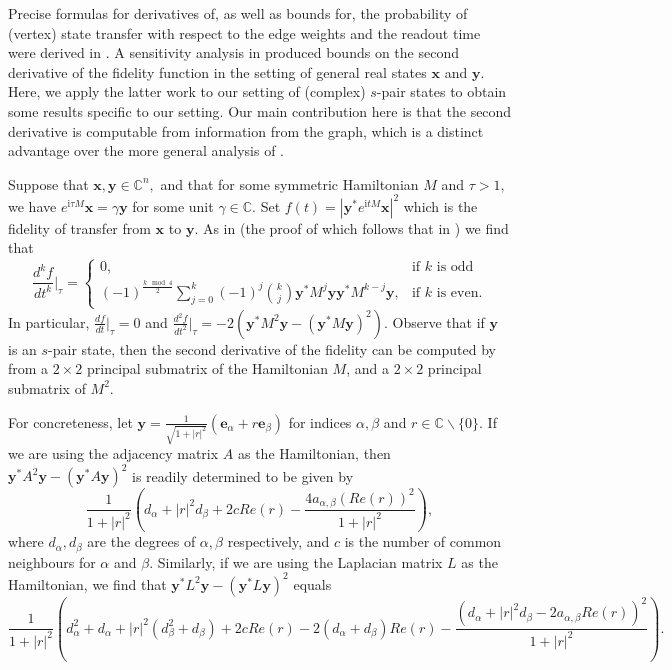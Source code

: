 \documentclass{article}
\numberwithin{equation}{section}
\newcommand{\be}{\mathbf e}
\newcommand{\bx}{\mathbf x}
\newcommand{\by}{\mathbf y}
\def\C{\mathbb{C}}
\def\ii{\mathrm{i}}
\begin{document}
{Precise formulas for derivatives of, as well as bounds for, the probability of (vertex) state transfer with respect to the edge weights and the readout time were derived in \cite{kirkland2015sensitivity,gordon2016bounds}. %
A sensitivity analysis in \cite{godsil2025perfect} produced bounds on the second derivative of the fidelity function in the setting of general real states $\bx$ and $\by$. Here, we apply the latter work to our setting of (complex) $s$-pair states to obtain some results specific to our setting. Our main contribution here is that the second derivative is computable from information from the graph, which is a distinct advantage over the more general analysis of \cite{godsil2025perfect}. 

Suppose that $\bx, \by \in \C^n,$ and that for some symmetric Hamiltonian $M$ and $\tau>1,$ we have $e^{\ii  \tau M}\bx = \gamma \by$ for some unit $\gamma \in \C.$ Set $f(t)=|\by^*e^{\ii  tM}\bx|^2$ which is the fidelity of transfer from $\bx$ to $\by$. As in \cite{godsil2025perfect} (the proof of which  follows that in  \cite{kirkland2015sensitivity}) we find that 
\begin{equation*}
\frac{d^k f}{d t^k}\bigg|_{\tau} = \begin{cases} 
0, & \text{if $k$ is odd} \\
(-1)^{\frac{k \mod 4}{2}}\sum_{j=0}^k(-1)^j {k \choose j } \by^*M^j\by\by^*M^{k-j}\by,  & \text{if $k$ is even.} \end{cases} 
\end{equation*}
In particular, $\frac{d f}{d t}\big|_{\tau} =0$ and $\frac{d^2 f}{d t^2}\big|_{\tau} = -2(\by^*M^2\by - (\by^*M\by)^2).$ Observe that if $\by$ is an $s$-pair state, then the second derivative of the fidelity can be computed by from a $2\times 2$ principal submatrix of the Hamiltonian $M$, and a $2 \times 2$ principal submatrix of $M^2$. 

For concreteness, let $\by=\frac{1}{\sqrt{1+|r|^2}}(\be_\alpha +r\be_\beta)$ for indices $\alpha, \beta$ and $r \in \C\backslash\{0\}$. If we are using the adjacency matrix $A$ as the Hamiltonian, then $\by^*A^2\by - (\by^*A\by)^2$ is readily determined to be given by 
\begin{equation*}
\frac{1}{1+|r|^2}\left(d_\alpha + |r|^2 d_\beta + 2c Re(r)- \frac{4 a_{\alpha, \beta}(Re(r))^2 }{1+|r|^2}\right), 
\end{equation*}
where $d_\alpha, d_\beta$ are the degrees of $\alpha, \beta$ respectively, and $c$ is the number of common neighbours for  $\alpha$ and $ \beta.$ Similarly, if we are using the Laplacian matrix $L$ as the Hamiltonian, we find that $\by^*L^2\by - (\by^*L\by)^2$ equals $$%
\frac{1}{1+|r|^2}\left( d_\alpha^2+d_\alpha +|r|^2(d_\beta^2+d_\beta)+2cRe(r)-2(d_\alpha+d_\beta)Re(r)
-\frac{(d_\alpha +|r|^2d_\beta -2a_{\alpha,\beta}Re(r))^2}{1+|r|^2}\right).$$


}
\end{document}
